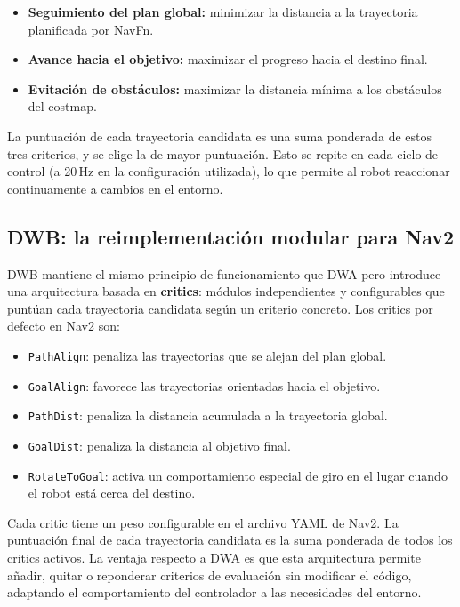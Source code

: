 \begin{itemize}
    \item \textbf{Seguimiento del plan global:} minimizar la distancia a la trayectoria planificada por NavFn.
    \item \textbf{Avance hacia el objetivo:} maximizar el progreso hacia el destino final.
    \item \textbf{Evitación de obstáculos:} maximizar la distancia mínima a los obstáculos del costmap.
\end{itemize}

La puntuación de cada trayectoria candidata es una suma ponderada de estos tres criterios, y se elige la de mayor puntuación. Esto se repite en cada ciclo de control (a 20\,Hz en la configuración utilizada), lo que permite al robot reaccionar continuamente a cambios en el entorno.

\subsection{DWB: la reimplementación modular para Nav2}

DWB mantiene el mismo principio de funcionamiento que DWA pero introduce una arquitectura basada en \textbf{critics}: módulos independientes y configurables que puntúan cada trayectoria candidata según un criterio concreto. Los critics por defecto en Nav2 son:

\begin{itemize}
    \item \texttt{PathAlign}: penaliza las trayectorias que se alejan del plan global.
    \item \texttt{GoalAlign}: favorece las trayectorias orientadas hacia el objetivo.
    \item \texttt{PathDist}: penaliza la distancia acumulada a la trayectoria global.
    \item \texttt{GoalDist}: penaliza la distancia al objetivo final.
    \item \texttt{RotateToGoal}: activa un comportamiento especial de giro en el lugar cuando el robot está cerca del destino.
\end{itemize}

Cada critic tiene un peso configurable en el archivo YAML de Nav2. La puntuación final de cada trayectoria candidata es la suma ponderada de todos los critics activos. La ventaja respecto a DWA es que esta arquitectura permite añadir, quitar o reponderar criterios de evaluación sin modificar el código, adaptando el comportamiento del controlador a las necesidades del entorno.

